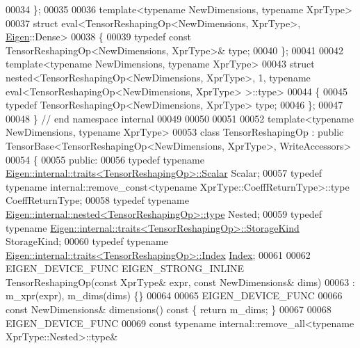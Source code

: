 \begin{DoxyCode}
00034 \};
00035 
00036 \textcolor{keyword}{template}<\textcolor{keyword}{typename} NewDimensions, \textcolor{keyword}{typename} XprType>
00037 \textcolor{keyword}{struct }eval<TensorReshapingOp<NewDimensions, XprType>, \hyperlink{namespace_eigen}{Eigen}::Dense>
00038 \{
00039   \textcolor{keyword}{typedef} \textcolor{keyword}{const} TensorReshapingOp<NewDimensions, XprType>& type;
00040 \};
00041 
00042 \textcolor{keyword}{template}<\textcolor{keyword}{typename} NewDimensions, \textcolor{keyword}{typename} XprType>
00043 \textcolor{keyword}{struct }nested<TensorReshapingOp<NewDimensions, XprType>, 1, typename eval<TensorReshapingOp<NewDimensions, 
      XprType> >::type>
00044 \{
00045   \textcolor{keyword}{typedef} TensorReshapingOp<NewDimensions, XprType> type;
00046 \};
00047 
00048 \}  \textcolor{comment}{// end namespace internal}
00049 
00050 
00051 
00052 \textcolor{keyword}{template}<\textcolor{keyword}{typename} NewDimensions, \textcolor{keyword}{typename} XprType>
00053 \textcolor{keyword}{class }TensorReshapingOp : \textcolor{keyword}{public} TensorBase<TensorReshapingOp<NewDimensions, XprType>, WriteAccessors>
00054 \{
00055   \textcolor{keyword}{public}:
00056   \textcolor{keyword}{typedef} \textcolor{keyword}{typename} \hyperlink{struct_eigen_1_1internal_1_1traits}{Eigen::internal::traits<TensorReshapingOp>::Scalar}
       Scalar;
00057   \textcolor{keyword}{typedef} \textcolor{keyword}{typename} internal::remove\_const<typename XprType::CoeffReturnType>::type CoeffReturnType;
00058   \textcolor{keyword}{typedef} \textcolor{keyword}{typename} \hyperlink{class_eigen_1_1internal_1_1_tensor_lazy_evaluator_writable}{Eigen::internal::nested<TensorReshapingOp>::type}
       Nested;
00059   \textcolor{keyword}{typedef} \textcolor{keyword}{typename} \hyperlink{struct_eigen_1_1internal_1_1traits}{Eigen::internal::traits<TensorReshapingOp>::StorageKind}
       StorageKind;
00060   \textcolor{keyword}{typedef} \textcolor{keyword}{typename} \hyperlink{struct_eigen_1_1internal_1_1traits}{Eigen::internal::traits<TensorReshapingOp>::Index}
       \hyperlink{namespace_eigen_a62e77e0933482dafde8fe197d9a2cfde}{Index};
00061 
00062   EIGEN\_DEVICE\_FUNC EIGEN\_STRONG\_INLINE TensorReshapingOp(\textcolor{keyword}{const} XprType& expr, \textcolor{keyword}{const} NewDimensions& dims)
00063       : m\_xpr(expr), m\_dims(dims) \{\}
00064 
00065     EIGEN\_DEVICE\_FUNC
00066     \textcolor{keyword}{const} NewDimensions& dimensions()\textcolor{keyword}{ const }\{ \textcolor{keywordflow}{return} m\_dims; \}
00067 
00068     EIGEN\_DEVICE\_FUNC
00069     \textcolor{keyword}{const} \textcolor{keyword}{typename} internal::remove\_all<typename XprType::Nested>::type&

\end{DoxyCode}
